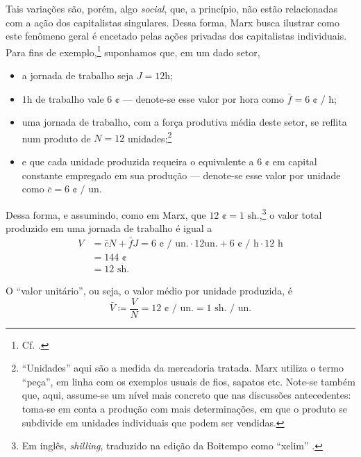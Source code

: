 Tais variações são, porém, algo \textit{social}, que, a princípio, não estão relacionadas com a ação dos capitalistas singulares. Dessa forma, Marx busca ilustrar como este fenômeno geral é encetado pelas ações privadas dos capitalistas individuais. Para fins de exemplo,\footnote{Cf. \textcite[pp. 391-4]{Marx2017}.} suponhamos que, em um dado setor,
\begin{itemize}
    \item a jornada de trabalho seja $J=12$h;
    \item $1$h de trabalho vale $6$ ¢ --- denote-se esse valor por hora como $\bar{f}= 6\text{ ¢ / h}$;
    \item uma jornada de trabalho, com a força produtiva média deste setor, se reflita num produto de $N=12$ unidades;\footnote{``Unidades'' aqui são a medida da mercadoria tratada. Marx utiliza o termo ``peça'', em linha com os exemplos usuais de fios, sapatos etc. Note-se também que, aqui, assume-se um nível mais concreto que nas discussões antecedentes: toma-se em conta a produção com mais determinações, em que o produto se subdivide em unidades individuais que podem ser vendidas.}
    \item e que cada unidade produzida requeira o equivalente a $6\text{ ¢}$ em capital constante empregado em sua produção --- denote-se esse valor por unidade como $\bar{c}=6\text{ ¢ / un.}$
\end{itemize}

Dessa forma, e assumindo, como em Marx, que $12\text{ ¢} = 1\text{ sh.}$,\footnote{Em inglês, \textit{shilling}, traduzido na edição da Boitempo como ``xelim'' \parencite{Marx2017}.} o valor total produzido em uma jornada de trabalho é igual a
\begin{align*}
    V &= \bar{c}N + \bar{f}J = 6\text{ ¢ / un.} \cdot 12\text{un.} + 6\text{ ¢ / h} \cdot 12\text{ h} \\
    &= 144\text{ ¢}\\
    &= 12\text{ sh.}
\end{align*}

O ``valor unitário'', ou seja, o valor médio por unidade produzida, é
$$
\bar{V} \coloneqq \frac{V}{N} = 12\text{ ¢ / un.} = 1\text{ sh. / un.}
$$

